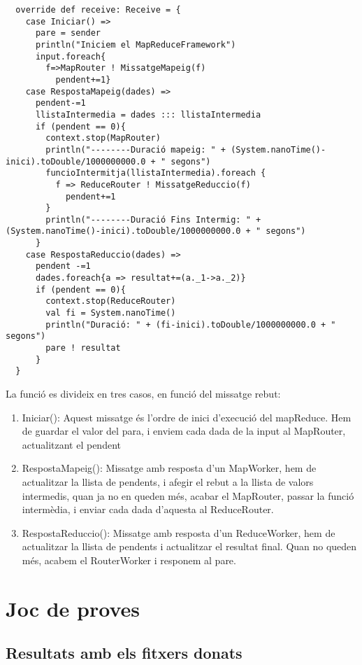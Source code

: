 \documentclass[11pt,a4paper,twoside]{report}
\begin{document}
\begin{lstlisting}
  override def receive: Receive = {
    case Iniciar() =>
      pare = sender
      println("Iniciem el MapReduceFramework")
      input.foreach{
        f=>MapRouter ! MissatgeMapeig(f)
          pendent+=1}
    case RespostaMapeig(dades) =>
      pendent-=1
      llistaIntermedia = dades ::: llistaIntermedia
      if (pendent == 0){
        context.stop(MapRouter)
        println("--------Duració mapeig: " + (System.nanoTime()-inici).toDouble/1000000000.0 + " segons")
        funcioIntermitja(llistaIntermedia).foreach {
          f => ReduceRouter ! MissatgeReduccio(f)
            pendent+=1
        }
        println("--------Duració Fins Intermig: " + (System.nanoTime()-inici).toDouble/1000000000.0 + " segons")
      }
    case RespostaReduccio(dades) =>
      pendent -=1
      dades.foreach{a => resultat+=(a._1->a._2)}
      if (pendent == 0){
        context.stop(ReduceRouter)
        val fi = System.nanoTime()
        println("Duració: " + (fi-inici).toDouble/1000000000.0 + " segons")
        pare ! resultat
      }
  }
\end{lstlisting}

La funció es divideix en tres casos, en funció del missatge rebut:
\begin{enumerate}
  \item Iniciar(): Aquest missatge és l'ordre de inici d'execució del mapReduce. Hem de guardar el valor del para, i enviem cada dada de la input al MapRouter, actualitzant el pendent
  \item RespostaMapeig(): Missatge amb resposta d'un MapWorker, hem de actualitzar la llista de pendents, i afegir el rebut a la llista de valors intermedis, quan ja no en queden més, acabar el MapRouter, passar la funció intermèdia, i enviar cada dada d'aquesta al ReduceRouter.
  \item RespostaReduccio(): Missatge amb resposta d'un ReduceWorker, hem de actualitzar la llista de pendents i actualitzar el resultat final. Quan no queden més, acabem el RouterWorker i responem al pare.
\end{enumerate}




\chapter{Joc de proves}

\section{Resultats amb els fitxers donats}
\end{document}
